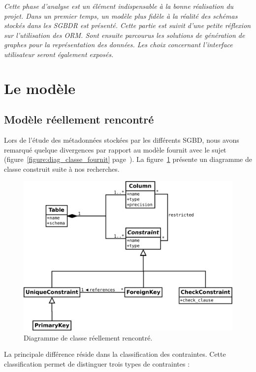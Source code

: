 \textit{Cette phase d'analyse est un élément indispensable à la bonne réalisation du projet. Dans un premier temps, un modèle plus fidèle à la réalité des schémas stockés dans les SGBDR est présenté. Cette partie est suivit d'une petite réflexion sur l'utilisation des ORM. Sont ensuite parcourus les solutions de génération de graphes pour la représentation des données. Les choix concernant l'interface utilisateur seront également exposés.}

\section{Le modèle}
\subsection{Modèle réellement rencontré}

Lors de l'étude des métadonnées stockées par les différents SGBD, nous avons remarqué quelque divergences par rapport au modèle fournit avec le sujet (figure~\ref{figure:diag_classe_fournit} page~\pageref{figure:diag_classe_fournit}). La figure~\ref{figure:diag_classe_reel} présente un diagramme de classe construit suite à nos recherches.

\begin{figure}[H]
\centering
\includegraphics[width=\textwidth]{files/diag_class_ameliore}
\caption{Diagramme de classe réellement rencontré.}
\label{figure:diag_classe_reel}
\end{figure}

La principale différence réside dans la classification des contraintes. Cette classification permet de distinguer trois types de contraintes :

